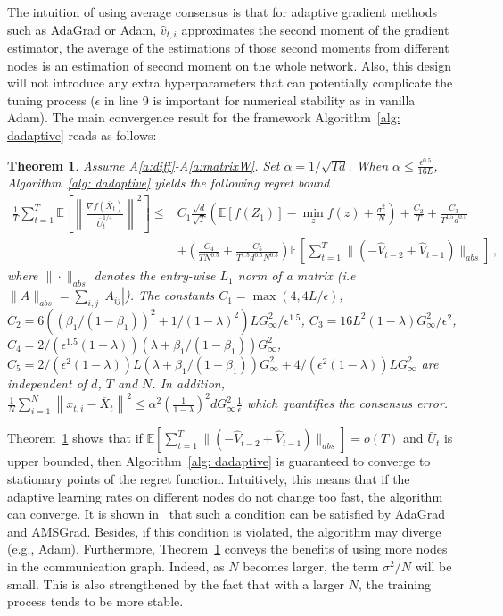 \documentclass{article} %
\newtheorem{theorem}{Theorem}
\begin{document}
The intuition of using average consensus is that for adaptive gradient methods such as AdaGrad or Adam, $\hat v_{t,i}$ approximates the second moment of the gradient estimator, the average of the estimations of those second moments from different nodes is an estimation of second moment on the whole network.  
Also, this design will not introduce any extra hyperparameters that can potentially complicate the tuning process ($\epsilon$ in line 9 is important for numerical stability as in vanilla Adam).  
The main convergence result for the framework Algorithm~\ref{alg: dadaptive} reads as follows:
\begin{theorem}\label{thm: dagm_converge}
Assume A\ref{a:diff}-A\ref{a:matrixW}.
Set $\alpha = 1/
	\sqrt{Td}$. When $\alpha  \leq \frac{\epsilon^{0.5}}{16L} $, 
	  Algorithm~\ref{alg: dadaptive} yields the following regret bound
	\begin{align}\label{eq: thm1}
	 \frac{1}{T}\sum_{t=1}^T  \mathbb E \left [\left\|\frac{\nabla f( \overline X_{t})}{\overline U_{t}^{1/4}}\right\|^2  \right] 
	\leq  & C_1 \frac{\sqrt{d}}{\sqrt{T}} \left(\mathbb E  [f( Z_{1})]  - \min_{z} f(z)  + \frac{\sigma^2}{N}\right)  +  \frac{ C_2 }{T}    + \frac{C_3}{T^{1.5}d^{0.5}}  \nonumber \\ 
	&+ \left(  \frac{C_4}{T N^{0.5} }  + \frac{C_5}{T^{1.5}d^{0.5} N^{0.5}}   \right) \mathbb E \left[ \sum_{t=1}^{T}   \|    (- \hat V_{t-2} + \hat V_{t-1} ) \|_{abs} \right]  \, ,
	\end{align}
where $\| \cdot\|_{abs}$  denotes the entry-wise $L_1$ norm of a matrix (i.e $\| A\|_{abs} = \sum_{i,j}{|A_{ij}|}$). The constants $C_1 =  \max (4, 4{L/\epsilon})$,
	$C_2 =  6 (( \beta_1/(1-\beta_1))^2 + 1/(1-\lambda)^2 )L  G_{\infty}^2 /\epsilon^{1.5}$,
	$C_3 =  16L^2  (1-\lambda) G_{\infty}^2/\epsilon^2$,
	$C_4 =   2/ (\epsilon^{1.5}(1-\lambda)) (     \lambda + \beta_1/(1-\beta_1)) G_{\infty}^2$,
	$C_5 =   2/ (\epsilon^{2}(1-\lambda))   L  (\lambda + \beta_1/(1-\beta_1)) G_{\infty}^2  + 4/ (\epsilon^{2}(1-\lambda))   L    G_{\infty}^2$ are independent of $d$, $T$ and $N$. In addition, $\frac{1}{N}\sum_{i=1}^N\left\| {  x_{t,i} -   \overline X_{t}}  \right\|^2   \leq \alpha^2 \left (\frac{1}{1-\lambda} \right)^2 d G_{\infty}^2 \frac{1}{\epsilon}$ which quantifies the consensus error.
\end{theorem}
Theorem~\ref{thm: dagm_converge} shows that if $\mathbb E [ \sum_{t=1}^{T} \|(- \hat V_{t-2} + \hat V_{t-1} ) \|_{abs} ]  = o(T)$ and $\bar U_t$ is upper bounded, then Algorithm~\ref{alg: dadaptive} is guaranteed to converge to stationary points of the regret function. 
Intuitively, this means that if the adaptive learning rates on different nodes do not change too fast, the algorithm can converge. 
It is shown in~\citet{chen2018convergence} that such a condition can be satisfied by AdaGrad and AMSGrad. 
Besides, if this condition is violated, the algorithm may diverge (e.g., Adam). 
Furthermore, Theorem~\ref{thm: dagm_converge} conveys the benefits of using more nodes in the communication graph. 
Indeed, as $N$ becomes larger, the term $\sigma^2/N$ will be small. 
This is also strengthened by the fact that with a larger $N$, the training process tends to be more stable. 
\end{document}
